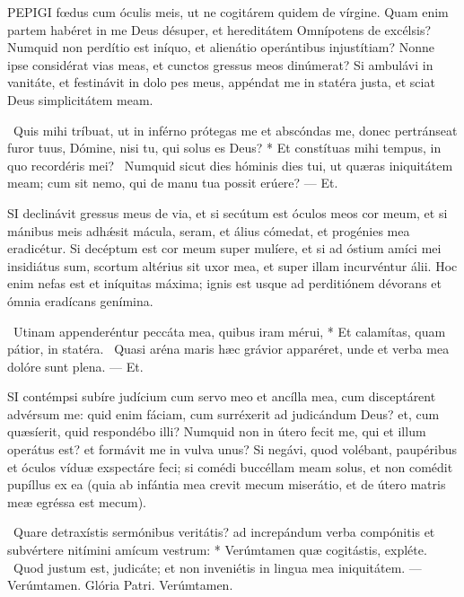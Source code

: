 


\lettrine[lines=2]{P}{EPIGI} fœdus cum óculis meis, ut ne cogitárem quidem de vírgine. Quam enim partem habéret in me Deus désuper, et hereditátem Omnípotens de excélsis? Numquid non perdítio est iníquo, et alienátio operántibus injustítiam? Nonne ipse considérat vias meas, et cunctos gressus meos dinúmerat? Si ambulávi in vanitáte, et festinávit in dolo pes meus, appéndat me in statéra justa, et sciat Deus simplicitátem meam.

\R\ Quis mihi tríbuat, ut in inférno prótegas me et abscóndas me, donec pertránseat furor tuus, Dómine, nisi tu, qui solus es Deus? * Et constítuas mihi tempus, in quo recordéris mei? \V\ Numquid sicut dies hóminis dies tui, ut quæras iniquitátem meam; cum sit nemo, qui de manu tua possit erúere? — Et.


\lettrine[lines=2]{S}{I} declinávit gressus meus de via, et si secútum est óculos meos cor meum, et si mánibus meis adhǽsit mácula, seram, et álius cómedat, et progénies mea eradicétur. Si decéptum est cor meum super mulíere, et si ad óstium amíci mei insidiátus sum, scortum altérius sit uxor mea, et super illam incurvéntur álii. Hoc enim nefas est et iníquitas máxima; ignis est usque ad perditiónem dévorans et ómnia eradícans genímina.

\R\ Utinam appenderéntur peccáta mea, quibus iram mérui, * Et calamítas, quam pátior, in statéra. \V\ Quasi aréna maris hæc grávior apparéret, unde et verba mea dolóre sunt plena. — Et.



\lettrine[lines=2]{S}{I} contémpsi subíre judícium cum servo meo et ancílla mea, cum disceptárent advérsum me: quid enim fáciam, cum surréxerit ad judicándum Deus? et, cum quæsíerit, quid respondébo illi? Numquid non in útero fecit me, qui et illum operátus est? et formávit me in vulva unus? Si negávi, quod volébant, paupéribus et óculos víduæ exspectáre feci; si comédi buccéllam meam solus, et non comédit pupíllus ex ea (quia ab infántia mea crevit mecum miserátio, et de útero matris meæ egréssa est mecum).

\R\ Quare detraxístis sermónibus veritátis? ad increpándum verba compónitis et subvértere nitímini amícum vestrum: * Verúmtamen quæ cogitástis, expléte. \V\ Quod justum est, judicáte; et non inveniétis in lingua mea iniquitátem. — Verúmtamen. Glória Patri. Verúmtamen.

